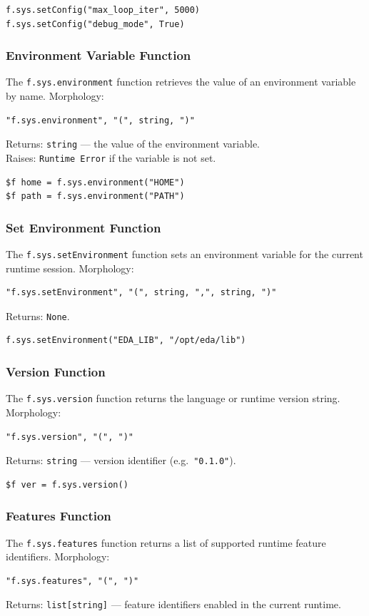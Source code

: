 \begin{verbatim}
f.sys.setConfig("max_loop_iter", 5000)
f.sys.setConfig("debug_mode", True)
\end{verbatim}

\subsubsection{Environment Variable Function}
The \texttt{f.sys.environment} function retrieves the value of an environment variable by name.
Morphology:
\begin{verbatim}
"f.sys.environment", "(", string, ")"
\end{verbatim}
Returns: \texttt{string} --- the value of the environment variable. \\
Raises: \texttt{Runtime Error} if the variable is not set.

\begin{verbatim}
$f home = f.sys.environment("HOME")
$f path = f.sys.environment("PATH")
\end{verbatim}

\subsubsection{Set Environment Function}
The \texttt{f.sys.setEnvironment} function sets an environment variable for the current runtime session.
Morphology:
\begin{verbatim}
"f.sys.setEnvironment", "(", string, ",", string, ")"
\end{verbatim}
Returns: \texttt{None}.

\begin{verbatim}
f.sys.setEnvironment("EDA_LIB", "/opt/eda/lib")
\end{verbatim}

\subsubsection{Version Function}
The \texttt{f.sys.version} function returns the language or runtime version string.
Morphology:
\begin{verbatim}
"f.sys.version", "(", ")"
\end{verbatim}
Returns: \texttt{string} --- version identifier (e.g.\ \texttt{"0.1.0"}).

\begin{verbatim}
$f ver = f.sys.version()
\end{verbatim}

\subsubsection{Features Function}
The \texttt{f.sys.features} function returns a list of supported runtime feature identifiers.
Morphology:
\begin{verbatim}
"f.sys.features", "(", ")"
\end{verbatim}
Returns: \texttt{list[string]} --- feature identifiers enabled in the current runtime.

